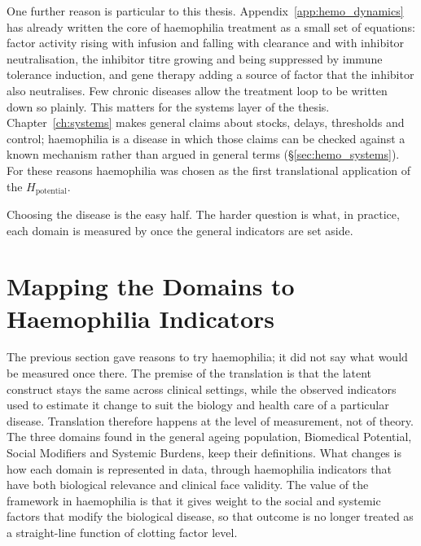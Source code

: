 One further reason is particular to this thesis. Appendix~\ref{app:hemo_dynamics} has already written the core of haemophilia treatment as a small set of equations: factor activity rising with infusion and falling with clearance and with inhibitor neutralisation, the inhibitor titre growing and being suppressed by immune tolerance induction, and gene therapy adding a source of factor that the inhibitor also neutralises. Few chronic diseases allow the treatment loop to be written down so plainly. This matters for the systems layer of the thesis. Chapter~\ref{ch:systems} makes general claims about stocks, delays, thresholds and control; haemophilia is a disease in which those claims can be checked against a known mechanism rather than argued in general terms (\S\ref{sec:hemo_systems}). For these reasons haemophilia was chosen as the first translational application of the $H_{\text{potential}}$.

Choosing the disease is the easy half. The harder question is what, in
practice, each domain is measured by once the general indicators are set aside.

\section{Mapping the Domains to Haemophilia Indicators}
\label{sec:hemo_mapping}

\noindent The previous section gave reasons to try haemophilia; it did not say what would be measured once there. The premise of the translation is that the latent construct stays the same across clinical settings, while the observed indicators used to estimate it change to suit the biology and health care of a particular disease. Translation therefore happens at the level of measurement, not of theory. The three domains found in the general ageing population, Biomedical Potential, Social Modifiers and Systemic Burdens, keep their definitions. What changes is how each domain is represented in data, through haemophilia indicators that have both biological relevance and clinical face validity. The value of the framework in haemophilia is that it gives weight to the social and systemic factors that modify the biological disease, so that outcome is no longer treated as a straight-line function of clotting factor level.

